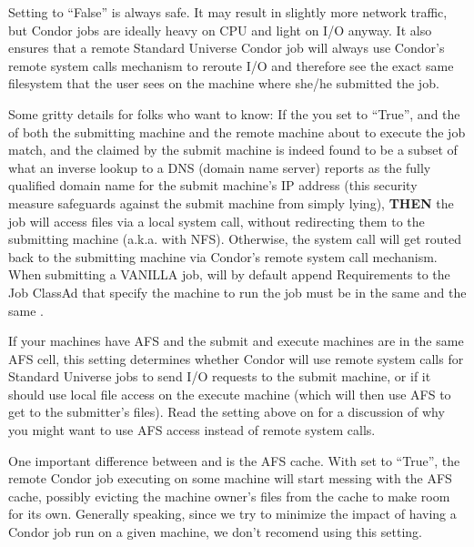 \begin{description}
  Setting  to ``False'' is always safe.  It may result
  in slightly more network traffic, but Condor jobs are ideally heavy
  on CPU and light on I/O anyway.  It also ensures that a remote
  Standard Universe Condor job will always use Condor's remote system
  calls mechanism to reroute I/O and therefore see the exact same
  filesystem that the user sees on the machine where she/he submitted
  the job.
  
  Some gritty details for folks who want to know: If the you set
   to ``True'', and the  of
  both the submitting machine and the remote machine about to execute
  the job match, and the  claimed by the
  submit machine is indeed found to be a subset of what an inverse
  lookup to a DNS (domain name server) reports as the fully qualified
  domain name for the submit machine's IP address (this security
  measure safeguards against the submit machine from simply lying),
  \textbf{THEN} the job will access files via a local system call,
  without redirecting them to the submitting machine (a.k.a. with
  NFS).  Otherwise, the system call will get routed back to the
  submitting machine via Condor's remote system call mechanism.  \Note
  When submitting a VANILLA job,  will by default append
  Requirements to the Job ClassAd that specify the machine to run
  the job must be in the same  and the same
  .
  
\item[\Macro{USE\_AFS}] \label{param:UseAfs} If your machines have AFS
  and the submit and execute machines are in the same AFS cell, this
  setting determines whether Condor will use remote system calls for
  Standard Universe jobs to send I/O requests to the submit machine,
  or if it should use local file access on the execute machine (which
  will then use AFS to get to the submitter's files).  Read the
  setting above on  for a discussion of why you might
  want to use AFS access instead of remote system calls.
  
  One important difference between  and
   is the AFS cache.  With  set to
  ``True'', the remote Condor job executing on some machine will start
  messing with the AFS cache, possibly evicting the machine owner's
  files from the cache to make room for its own.  Generally speaking,
  since we try to minimize the impact of having a Condor job run on a
  given machine, we don't recomend using this setting.


\end{description}
